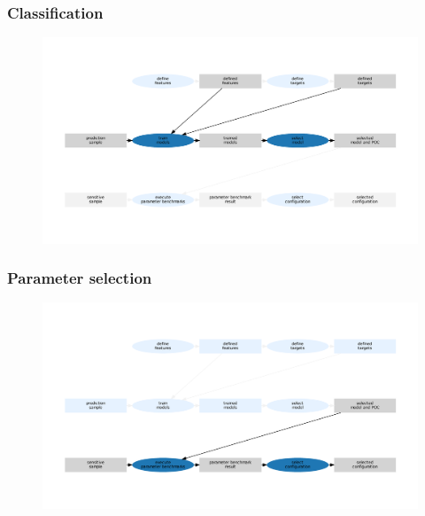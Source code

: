 \begin{frame}
	\frametitle{Classification}
	
	\begin{figure}
		\includegraphics[width=1\textwidth]{figures/flowchart_component_search_2}
	\end{figure}
	
\end{frame}


\begin{frame}
	\frametitle{Parameter selection}
	
	\begin{figure}
		\includegraphics[width=1\textwidth]{figures/flowchart_component_search_3}
	\end{figure}
	
\end{frame}














